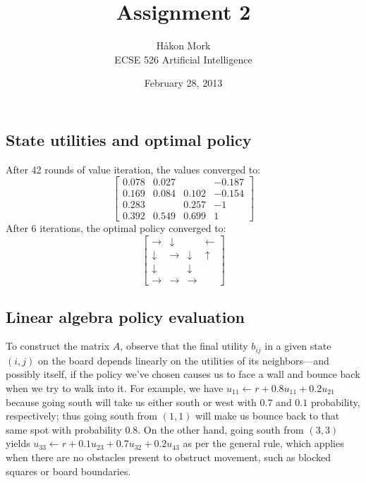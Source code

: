 \documentclass[letterpaper, 10pt]{article}
\title{\textbf{Assignment 2}}
\author{Håkon Mork \\ ECSE 526 Artificial Intelligence}
\date{February 28, 2013}
\begin{document}
\maketitle
\noindent
\begin{multicols}{2}

\section{}
\subsection{State utilities and optimal policy}
After 42 rounds of value iteration, the values converged to:
\[
	\begin{bmatrix}
		0.078 & 0.027 &       & -0.187 \\
		0.169 & 0.084 & 0.102 & -0.154 \\
		0.283 &       & 0.257 & -1 \\
		0.392 & 0.549 & 0.699 & 1
	\end{bmatrix}
\]
After 6 iterations, the optimal policy converged to:
\[
	\begin{bmatrix}
		\rightarrow & \downarrow &       & \leftarrow \\
		\downarrow & \rightarrow & \downarrow & \uparrow \\
		\downarrow &       & \downarrow &  \\
		\rightarrow & \rightarrow & \rightarrow & 
	\end{bmatrix}
\]

\subsection{Linear algebra policy evaluation}
To construct the matrix $A$, observe that the final utility $b_{ij}$ in a given state $(i, j)$ on the board depends linearly on the utilities of its neighbors---and possibly itself, if the policy we've chosen causes us to face a wall and bounce back when we try to walk into it. 
For example, we have $u_{11} \gets r + 0.8 u_{11} + 0.2 u_{21}$ because going south will take us either south or west with $0.7$ and $0.1$ probability, respectively; thus going south from $(1,1)$ will make us bounce back to that same spot with probability $0.8$. 
On the other hand, going south from $(3,3)$ yields $u_{33} \gets r + 0.1 u_{23} + 0.7 u_{32} + 0.2 u_{43}$ as per the general rule, which applies when there are no obstacles present to obstruct movement, such as blocked squares or board boundaries. 


\end{multicols}
\end{document}
